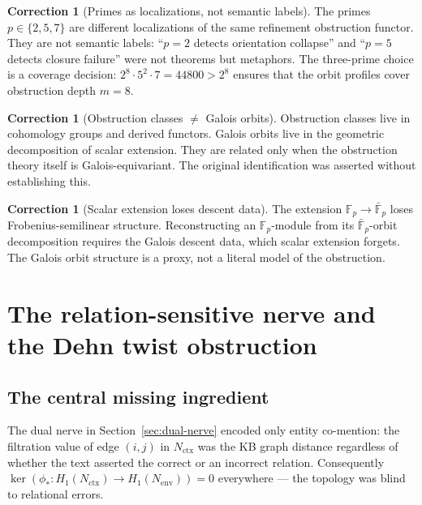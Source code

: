 \documentclass[11pt]{amsart}
\theoremstyle{definition}
\newtheorem{correction}[theorem]{Correction}
\newcommand{\Nctx}{N_{\mathrm{ctx}}}
\newcommand{\Nenv}{N_{\mathrm{env}}}
\newcommand{\Fp}{\mathbb{F}_p}
\newcommand{\Fbar}{\bar{\mathbb{F}}_p}
\begin{document}
\begin{correction}[Primes as localizations, not semantic labels]
The primes $p \in \{2,5,7\}$ are different localizations of the
same refinement obstruction functor.
They are not semantic labels:
``$p=2$ detects orientation collapse'' and
``$p=5$ detects closure failure'' were not theorems but metaphors.
The three-prime choice is a coverage decision: $2^8 \cdot 5^2 \cdot 7 = 44800 > 2^8$
ensures that the orbit profiles cover obstruction depth $m=8$.
\end{correction}

\begin{correction}[Obstruction classes $\neq$ Galois orbits]
Obstruction classes live in cohomology groups and derived functors.
Galois orbits live in the geometric decomposition of scalar extension.
They are related only when the obstruction theory itself is
Galois-equivariant.
The original identification was asserted without establishing this.
\end{correction}

\begin{correction}[Scalar extension loses descent data]
The extension $\Fp \to \Fbar$ loses Frobenius-semilinear structure.
Reconstructing an $\Fp$-module from its $\Fbar$-orbit decomposition
requires the Galois descent data, which scalar extension forgets.
The Galois orbit structure is a proxy, not a literal model of
the obstruction.
\end{correction}

\section{The relation-sensitive nerve and the Dehn twist obstruction}
\label{sec:rel-nerve}

\subsection{The central missing ingredient}

The dual nerve in Section~\ref{sec:dual-nerve} encoded only entity
co-mention: the filtration value of edge $(i,j)$ in $\Nctx$ was the KB
graph distance regardless of whether the text asserted the correct or
an incorrect relation.
Consequently $\ker(\phi_*: H_1(\Nctx) \to H_1(\Nenv)) = 0$ everywhere ---
the topology was blind to relational errors.
\end{document}
